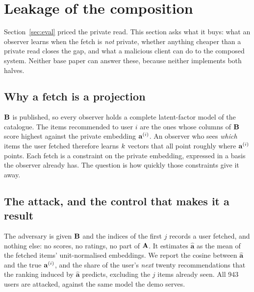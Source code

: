 \section{Leakage of the composition}
\label{sec:leak}

Section~\ref{sec:eval} priced the private read. This section asks what it buys:
what an observer learns when the fetch is \emph{not} private, whether anything
cheaper than a private read closes the gap, and what a malicious client can do
to the composed system. Neither base paper can answer these, because neither
implements both halves.

\subsection{Why a fetch is a projection}
\label{sec:leak:why}

$\mathbf{B}$ is published, so every observer holds a complete latent-factor model
of the catalogue. The items recommended to user $i$ are the ones whose columns of
$\mathbf{B}$ score highest against the private embedding $\mathbf{a}^{(i)}$. An observer
who sees \emph{which} items the user fetched therefore learns $k$ vectors
that all point roughly where $\mathbf{a}^{(i)}$ points. Each fetch is a constraint on the
private embedding, expressed in a basis the observer already has. The question is
how quickly those constraints give it away.

\subsection{The attack, and the control that makes it a result}
\label{sec:leak:attack}

The adversary is given $\mathbf{B}$ and the indices of the first $j$ records a
user fetched, and nothing else: no scores, no ratings, no part of $\mathbf{A}$.
It estimates $\hat{\mathbf{a}}$ as the mean of the fetched items' unit-normalised
embeddings. We report the cosine between $\hat{\mathbf{a}}$ and the true
$\mathbf{a}^{(i)}$, and the share of the user's \emph{next} twenty recommendations that
the ranking induced by $\hat{\mathbf{a}}$ predicts, excluding the $j$ items
already seen. All 943 users are attacked, against the same model the demo serves.

